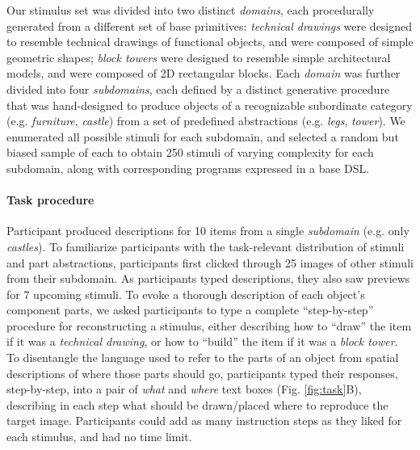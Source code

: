 \documentclass[10pt,letterpaper]{article}
\begin{document}
Our stimulus set was divided into two distinct \textit{domains}, each procedurally generated from a different set of base primitives:
\textit{technical drawings} were designed to resemble technical drawings of functional objects, and were composed of simple geometric shapes; 
\textit{block towers} were designed to resemble simple architectural models, and were composed of 2D rectangular blocks.
Each \textit{domain} was further divided into four \textit{subdomains}, each defined by a distinct generative procedure that was hand-designed to produce objects of a recognizable subordinate category (e.g. \textit{furniture}, \textit{castle}) from a set of predefined abstractions (e.g. \textit{legs}, \textit{tower}).
We enumerated all possible stimuli for each subdomain, and selected a random but biased sample of each to obtain 250 stimuli of varying complexity for each subdomain, along with corresponding programs expressed in a base DSL.

\paragraph{Task procedure}

Participant produced descriptions for 10 items from a single \textit{subdomain} (e.g. only \textit{castles}). 
To familiarize participants with the task-relevant distribution of stimuli and part abstractions, participants first clicked through 25 images of other stimuli from their subdomain. 
As participants typed descriptions, they also saw previews for 7 upcoming stimuli.
To evoke a thorough description of each object's component parts, we asked participants to type a complete ``step-by-step'' procedure for reconstructing a stimulus, either describing how to ``draw'' the item if it was a \textit{technical drawing}, or how to ``build'' the item if it was a \textit{block tower}.
To disentangle the language used to refer to the parts of an object from spatial descriptions of where those parts should go, participants typed their responses, step-by-step, into a pair of \textit{what} and \textit{where} text boxes (Fig. \ref{fig:task}B), describing in each step what should be drawn/placed where to reproduce the target image.
Participants could add as many instruction steps as they liked for each stimulus, and had no time limit.
\end{document}
